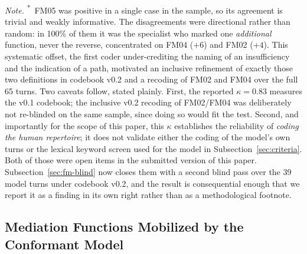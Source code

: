 \documentclass{sbc2023}%
\begin{document}
\noindent\textit{Note.} \textsuperscript{*}~FM05 was positive in a single case in the sample, so its agreement is trivial and weakly informative. The disagreements were directional rather than random: in 100\% of them it was the specialist who marked one \textit{additional} function, never the reverse, concentrated on FM04 ($+6$) and FM02 ($+4$). This systematic offset, the first coder under-crediting the naming of an insufficiency and the indication of a path, motivated an inclusive refinement of exactly those two definitions in codebook v0.2 and a recoding of FM02 and FM04 over the full 65 turns. Two caveats follow, stated plainly. First, the reported $\kappa = 0.83$ measures the v0.1 codebook; the inclusive v0.2 recoding of FM02/FM04 was deliberately not re-blinded on the same sample, since doing so would fit the test. Second, and importantly for the scope of this paper, this $\kappa$ establishes the reliability of \textit{coding the human repertoire}; it does not validate either the coding of the model's own turns or the lexical keyword screen used for the model in Subsection~\ref{sec:criteria}. Both of those were open items in the submitted version of this paper. Subsection~\ref{sec:fm-blind} now closes them with a second blind pass over the 39 model turns under codebook v0.2, and the result is consequential enough that we report it as a finding in its own right rather than as a methodological footnote.

\subsection{Mediation Functions Mobilized by the Conformant Model}
\label{sec:fm-model}
\end{document}
